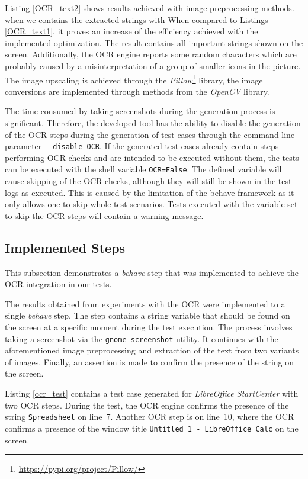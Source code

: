 Listing \ref{OCR_text2} shows results achieved with image preprocessing methods. when we  contains the extracted strings with  When compared to Listings \ref{OCR_text1}, it proves an increase of the efficiency achieved with the implemented optimization. The result contains all important strings shown on the screen. Additionally, the OCR engine reports some random characters which are probably caused by a misinterpretation of a group of smaller icons in the picture. The image upscaling is achieved through the \textit{Pillow}\footnote{\url{https://pypi.org/project/Pillow/}} library, the image conversions are implemented through methods from the \textit{OpenCV} library. 

The time consumed by taking screenshots during the generation process is significant. Therefore, the developed tool has the ability to disable the generation of the OCR steps during the generation of test cases through the command line parameter \texttt{-{}-disable-OCR}. If the generated test cases already contain steps performing OCR checks and are intended to be executed without them, the tests can be executed with the shell variable \texttt{OCR=False}. The defined variable will cause skipping of the OCR checks, although they will still be shown in the test logs as executed. This is caused by the limitation of the behave framework as it only allows one to skip whole test scenarios. Tests executed with the variable set to skip the OCR steps will contain a warning message.

\subsection{Implemented Steps}\label{OCR_steps}
This subsection demonstrates a \textit{behave} step that was implemented to achieve the OCR integration in our tests. 

The results obtained from experiments with the OCR were implemented to a single \textit{behave} step. The step contains a string variable that should be found on the screen at a specific moment during the test execution. The process involves taking a screenshot via the \texttt{gnome-screenshot} utility. It continues with the aforementioned image preprocessing and extraction of the text from two variants of images. Finally, an assertion is made to confirm the presence of the string on the screen. 

Listing \ref{ocr_test} contains a test case generated for \textit{LibreOffice StartCenter} with two OCR steps. During the test, the OCR engine confirms the presence of the string \texttt{Spreadsheet} on line~7. Another OCR step is on line~10, where the OCR confirms a presence of the window title \texttt{Untitled 1 - LibreOffice Calc} on the screen.

